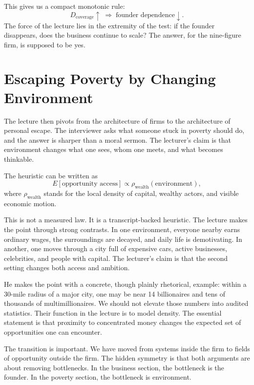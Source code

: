 This gives us a compact monotonic rule:
\begin{equation}
D_{\text{coverage}}\uparrow \;\Rightarrow\; \text{founder dependence}\downarrow.
\end{equation}
The force of the lecture lies in the extremity of the test: if the founder disappears, does the business continue to scale? The answer, for the nine-figure firm, is supposed to be yes.

\section{Escaping Poverty by Changing Environment}

The lecture then pivots from the architecture of firms to the architecture of personal escape. The interviewer asks what someone stuck in poverty should do, and the answer is sharper than a moral sermon. The lecturer's claim is that environment changes what one sees, whom one meets, and what becomes thinkable.

The heuristic can be written as
\begin{equation}
E[\text{opportunity access}] \propto \rho_{\text{wealth}}(\text{environment}),
\end{equation}
where \(\rho_{\text{wealth}}\) stands for the local density of capital, wealthy actors, and visible economic motion.

This is not a measured law. It is a transcript-backed heuristic. The lecture makes the point through strong contrasts. In one environment, everyone nearby earns ordinary wages, the surroundings are decayed, and daily life is demotivating. In another, one moves through a city full of expensive cars, active businesses, celebrities, and people with capital. The lecturer's claim is that the second setting changes both access and ambition.

He makes the point with a concrete, though plainly rhetorical, example: within a 30-mile radius of a major city, one may be near 14 billionaires and tens of thousands of multimillionaires. We should not elevate those numbers into audited statistics. Their function in the lecture is to model density. The essential statement is that proximity to concentrated money changes the expected set of opportunities one can encounter.

The transition is important. We have moved from systems inside the firm to fields of opportunity outside the firm. The hidden symmetry is that both arguments are about removing bottlenecks. In the business section, the bottleneck is the founder. In the poverty section, the bottleneck is environment.

